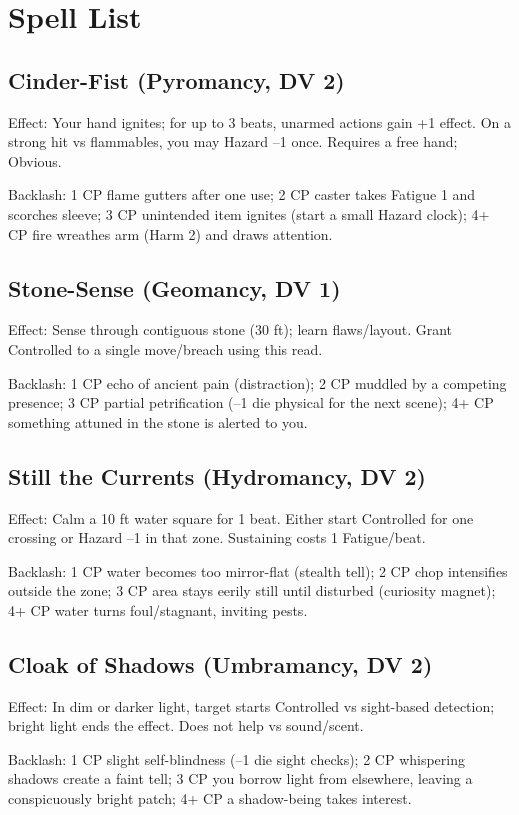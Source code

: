 \section{Spell List}

\subsection{Cinder-Fist (Pyromancy, DV 2)}
Effect: Your hand ignites; for up to 3 beats, unarmed actions gain +1 effect. On a strong hit vs flammables, you may Hazard --1 once. Requires a free hand; Obvious.

Backlash: 1 CP flame gutters after one use; 2 CP caster takes Fatigue 1 and scorches sleeve; 3 CP unintended item ignites (start a small Hazard clock); 4+ CP fire wreathes arm (Harm 2) and draws attention.

\subsection{Stone-Sense (Geomancy, DV 1)}
Effect: Sense through contiguous stone (30 ft); learn flaws/layout. Grant Controlled to a single move/breach using this read.

Backlash: 1 CP echo of ancient pain (distraction); 2 CP muddled by a competing presence; 3 CP partial petrification (--1 die physical for the next scene); 4+ CP something attuned in the stone is alerted to you.

\subsection{Still the Currents (Hydromancy, DV 2)}
Effect: Calm a 10 ft water square for 1 beat. Either start Controlled for one crossing or Hazard --1 in that zone. Sustaining costs 1 Fatigue/beat.

Backlash: 1 CP water becomes too mirror-flat (stealth tell); 2 CP chop intensifies outside the zone; 3 CP area stays eerily still until disturbed (curiosity magnet); 4+ CP water turns foul/stagnant, inviting pests.

\subsection{Cloak of Shadows (Umbramancy, DV 2)}
Effect: In dim or darker light, target starts Controlled vs sight-based detection; bright light ends the effect. Does not help vs sound/scent.

Backlash: 1 CP slight self-blindness (--1 die sight checks); 2 CP whispering shadows create a faint tell; 3 CP you borrow light from elsewhere, leaving a conspicuously bright patch; 4+ CP a shadow-being takes interest.

